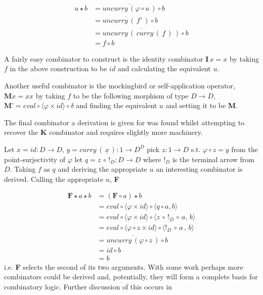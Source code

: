 \begin{align*}
    u \star b &= \overline{uncurry \, (\varphi \circ u \, )} \circ b \\
    &= \overline{uncurry \, ( \, f' \, ) } \circ b \\
    &= \overline{uncurry \, ( \, curry \, ( \, \underline{f} \, ) \, )} \circ b \\
    &= f \circ b
\end{align*}


A fairly easy combinator to construct is the identity combinator $\textbf{I} \, x =
x$ by taking $f$ in the above construction to be $id$ and calculating the
equivalent $u$.

Another useful combinator is the mockingbird or self-application operator,
$\textbf{M} x = x x$ by taking $f$ to be the following morphism of type $D
\rightarrow D$, $\textbf{M'} = eval \circ \langle \varphi \times id \rangle \circ
\delta$ and finding the equivalent $u$ and setting it to be \textbf{M}.

The final combinator a derivation is given for was found whilst attempting to
recover the \textbf{K} combinator and requires slightly more machinery.

Let $x = id : D \rightarrow D$, $y = curry \, ( \, \underline{x} \, ) : 1
\rightarrow D^D$ pick $z : 1 \rightarrow D$ s.t. $\varphi \circ z = y$ from the
point-surjectivity of $\varphi$ let $q = z \, \circ \, !_{D} : D \rightarrow D$
where $!_{D}$ is the terminal arrow from $D$. Taking $f$ as $q$ and deriving the
appropriate $u$ an interesting combinator is derived. Calling the appropriate
$u$, \textbf{F}

\begin{align*}
    \textbf{F} \star a \star b &= (\textbf{F} \circ a) \star b \\
    &= eval \circ \langle \varphi  \times id \rangle \circ \langle q \circ a , b
    \rangle \\
    &= eval \circ \langle \varphi \times id \rangle \circ \langle z \, \circ \, !_{D}
    \, \circ \, a , \, b \rangle \\
    &= eval \circ \langle \varphi \circ z \times id \rangle \circ \langle !_{D} \,
    \circ \, a \, , \, b \rangle \\
    &= \overline{uncurry \, ( \varphi \circ z \, )} \circ b \\
    &= id \circ b \\
    &= b
\end{align*}
i.e. \textbf{F} selects the second of its two arguments. With some work perhaps
more combinators could be derived and, potentially, they will form a complete
basis for combinatory logic. Further discussion of this occurs in 
